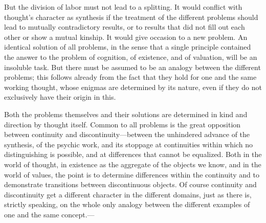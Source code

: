 \documentclass[12pt,a4paper]{book}
\newcommand{\opage}[1]{\marginnote{\footnotesize\textit{[#1]}}}
\begin{document}
But the division of labor must not lead to a splitting. It would conflict
with thought's character as synthesis if the treatment of the different
problems should lead to mutually contradictory results, or to results that did
not fill out each other or show a mutual kinship. It would give occasion to a
new problem. An identical solution of all problems, in the sense that a single
principle contained the answer to the problem of cognition, of existence, and
of valuation, will be an insoluble task. But there must be assumed to be an
analogy between the different problems; this follows already from the fact
that they hold for one and the same working thought, whose enigmas are
determined by its nature, even if they do not exclusively have their origin in
this.

\opage{252}Both the problems themselves and their solutions are determined in kind and
direction by thought itself. Common to all problems is the great opposition
between continuity and discontinuity---between the unhindered advance of the
synthesis, of the psychic work, and its stoppage at continuities within which
no distinguishing is possible, and at differences that cannot be equalized.
Both in the world of thought, in existence as the aggregate of the objects we
know, and in the world of values, the point is to determine differences
within the continuity and to demonstrate transitions between discontinuous
objects. Of course continuity and discontinuity get a different character in
the different domains, just as there is, strictly speaking, on the whole only
analogy between the different examples of one and the same concept.---
\end{document}
